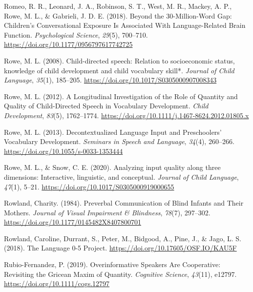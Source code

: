 \documentclass[
  man]{apa6}
\newlength{\cslhangindent}
\newlength{\cslentryspacingunit} %
\newenvironment{CSLReferences}[2] %
 {%
  \setlength{\parindent}{0pt}
  \ifodd #1
  \let\oldpar\par
  \def\par{\hangindent=\cslhangindent\oldpar}
  \fi
  \setlength{\parskip}{#2\cslentryspacingunit}
 }%
 {}
\begin{document}
\begin{CSLReferences}{1}{0}
\leavevmode{}%
Romeo, R. R., Leonard, J. A., Robinson, S. T., West, M. R., Mackey, A. P., Rowe, M. L., \& Gabrieli, J. D. E. (2018). Beyond the 30-{Million-Word Gap}: {Children}'s {Conversational Exposure Is Associated With Language-Related Brain Function}. \emph{Psychological Science}, \emph{29}(5), 700--710. \url{https://doi.org/10.1177/0956797617742725}

\leavevmode{}%
Rowe, M. L. (2008). Child-directed speech: Relation to socioeconomic status, knowledge of child development and child vocabulary skill*. \emph{Journal of Child Language}, \emph{35}(1), 185--205. \url{https://doi.org/10.1017/S0305000907008343}

\leavevmode{}%
Rowe, M. L. (2012). A {Longitudinal Investigation} of the {Role} of {Quantity} and {Quality} of {Child-Directed Speech} in {Vocabulary Development}. \emph{Child Development}, \emph{83}(5), 1762--1774. \url{https://doi.org/10.1111/j.1467-8624.2012.01805.x}

\leavevmode{}%
Rowe, M. L. (2013). Decontextualized {Language Input} and {Preschoolers}' {Vocabulary Development}. \emph{Seminars in Speech and Language}, \emph{34}(4), 260--266. \url{https://doi.org/10.1055/s-0033-1353444}

\leavevmode{}%
Rowe, M. L., \& Snow, C. E. (2020). Analyzing input quality along three dimensions: Interactive, linguistic, and conceptual. \emph{Journal of Child Language}, \emph{47}(1), 5--21. \url{https://doi.org/10.1017/S0305000919000655}

\leavevmode{}%
Rowland, Charity. (1984). Preverbal {Communication} of {Blind Infants} and {Their Mothers}. \emph{Journal of Visual Impairment \& Blindness}, \emph{78}(7), 297--302. \url{https://doi.org/10.1177/0145482X8407800701}

\leavevmode{}%
Rowland, Caroline, Durrant, S., Peter, M., Bidgood, A., Pine, J., \& Jago, L. S. (2018). The {Language} 0-5 {Project}. \url{https://doi.org/10.17605/OSF.IO/KAU5F}

\leavevmode{}%
Rubio-Fernandez, P. (2019). Overinformative {Speakers Are Cooperative}: {Revisiting} the {Gricean Maxim} of {Quantity}. \emph{Cognitive Science}, \emph{43}(11), e12797. \url{https://doi.org/10.1111/cogs.12797}


\end{CSLReferences}
\end{document}
